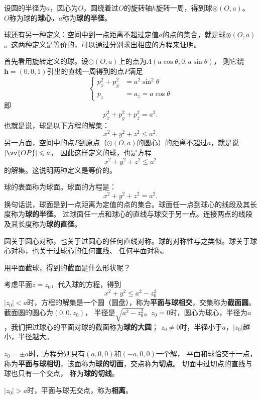 \documentclass[12pt,UTF8,fontset=none]{ctexbook}
\begin{document}
设圆的半径为$a$，圆心为$O$，圆绕着过$O$的旋转轴$h$旋转一周，得到球$\circledast(O,a)$。
$O$称为球的\textbf{球心}，$a$称为\textbf{球的半径}。

球还有另一种定义：空间中到一点距离不超过定值$a$的点的集合，就是球$\circledast(O,a)$。这两种定义是等价的，可以通过分别求出相应的方程来证明。

首先看用旋转定义的球。设$\odot(O,a)$上的点为$A(a\cos{\theta}, 0, a\sin{\theta})$，
则它绕$\mathbf{h} = (0,0,1)$引出的直线一周得到的点$P$满足
$$
\left\{
\begin{array}{rl}
p_x^2+p_y^2 &= a^2\sin^2{\theta} \\
p_z &= a_z = a\cos{\theta}
\end{array}
\right.
$$
即
$$ p_x^2 + p_y^2 + p_z^2 = a^2.$$
也就是说，球是以下方程的解集：
$$ x^2 + y^2 + z^2 \leqslant a^2.$$
另一方面，空间中的点$P$到原点（$\odot(O,a)$的圆心）的距离不超过$a$，就是说$\left|\vv{OP}\right| \leqslant a$​，
因此这样定义的球，也是方程
$$ x^2 + y^2 + z^2 \leqslant a^2$$
的解集。这说明两种定义是等价的。

球的表面称为球面。球面的方程是：
$$ x^2 + y^2 + z^2 = a^2.$$
换句话说，球面是到一点距离为定值的点的集合。球面任一点到球心的线段及其长度称为\textbf{球的半径}。
过球面任一点和球心的直线与球交于另一点。连接两点的线段及其长度称为\textbf{球的直径}。

圆关于圆心对称，也关于过圆心的任何直线对称。球的对称性与之类似。球关于球心对称，也关于过球心的任何直线、
任何平面对称。

用平面截球，得到的截面是什么形状呢？

考虑平面$z=z_0$，代入球的方程，得到
$$ x^2 + y^2 \leqslant a^2-z_0^2 $$
$|z_0|<a$时，方程的解集是一个圆（圆盘），称为\textbf{平面与球相交}，交集称为\textbf{截面圆}。截面圆的圆心为$(0,0,z_0)$，
半径是$\sqrt{a^2-z_0^2}$。$z_0=0$时，圆心为球心，半径为$a$，我们把过球心的平面对球的截面称为\textbf{球的大圆}；
$z_0\neq 0$时，半径小于$a$，$|z_0|$越小，半径越大。

$z_0=\pm a$时，方程分别只有$(a,0,0)$和$(-a,0,0)$一个解，
平面和球恰交于一点，称为\textbf{平面与球相切}，该面称为\textbf{球的切面}，交点称为\textbf{切点}。
切面中过切点的直线与球也只有一个交点，
称为\textbf{球的切线}。

$|z_0|>a$时，平面与球无交点，称为\textbf{相离}。
\end{document}
